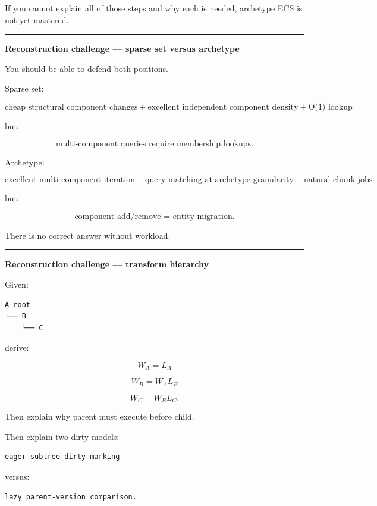 If you cannot explain all of those steps and why each is needed, archetype ECS is not yet mastered.

\begin{center}\rule{0.5\linewidth}{0.5pt}\end{center}

\textbf{Reconstruction challenge --- sparse set versus archetype}

You should be able to defend both positions.

Sparse set:

\[
\text{cheap structural component changes}
+
\text{excellent independent component density}
+
\text{O(1) lookup}
\]

but:

\[
\text{multi-component queries require membership lookups}.
\]

Archetype:

\[
\text{excellent multi-component iteration}
+
\text{query matching at archetype granularity}
+
\text{natural chunk jobs}
\]

but:

\[
\text{component add/remove = entity migration}.
\]

There is no correct answer without workload.

\begin{center}\rule{0.5\linewidth}{0.5pt}\end{center}

\textbf{Reconstruction challenge --- transform hierarchy}

Given:

\begin{verbatim}
A root
└── B
    └── C
\end{verbatim}

derive:

\[
W_A=L_A
\]

\[
W_B=W_AL_B
\]

\[
W_C=W_BL_C.
\]

Then explain why parent must execute before child.

Then explain two dirty models:

\begin{verbatim}
eager subtree dirty marking
\end{verbatim}

versus:

\begin{verbatim}
lazy parent-version comparison.
\end{verbatim}

